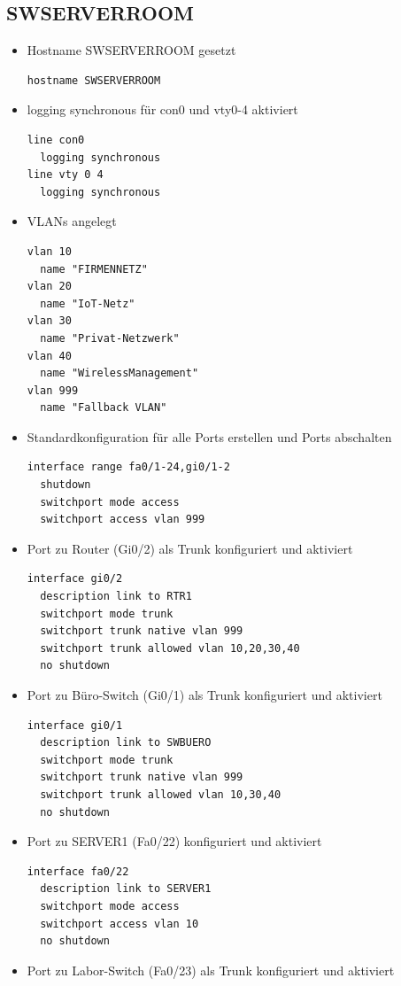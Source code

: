 \documentclass[11pt]{article}
\begin{document}
\subsection{SWSERVERROOM}
\label{sec:org86be69a}
\begin{itemize}
\item Hostname SWSERVERROOM gesetzt
\begin{verbatim}
hostname SWSERVERROOM
\end{verbatim}
\item logging synchronous für con0 und vty0-4 aktiviert
\begin{verbatim}
line con0
  logging synchronous
line vty 0 4
  logging synchronous
\end{verbatim}
\item VLANs angelegt
\begin{verbatim}
vlan 10
  name "FIRMENNETZ"
vlan 20
  name "IoT-Netz"
vlan 30
  name "Privat-Netzwerk"
vlan 40
  name "WirelessManagement"
vlan 999
  name "Fallback VLAN"
\end{verbatim}
\item Standardkonfiguration für alle Ports erstellen und Ports abschalten
\begin{verbatim}
interface range fa0/1-24,gi0/1-2
  shutdown
  switchport mode access
  switchport access vlan 999
\end{verbatim}
\item Port zu Router (Gi0/2) als Trunk konfiguriert und aktiviert
\begin{verbatim}
interface gi0/2
  description link to RTR1
  switchport mode trunk
  switchport trunk native vlan 999
  switchport trunk allowed vlan 10,20,30,40
  no shutdown
\end{verbatim}
\item Port zu Büro-Switch (Gi0/1) als Trunk konfiguriert und aktiviert
\begin{verbatim}
interface gi0/1
  description link to SWBUERO
  switchport mode trunk
  switchport trunk native vlan 999
  switchport trunk allowed vlan 10,30,40
  no shutdown
\end{verbatim}
\item Port zu SERVER1 (Fa0/22) konfiguriert und aktiviert
\begin{verbatim}
interface fa0/22
  description link to SERVER1
  switchport mode access
  switchport access vlan 10
  no shutdown
\end{verbatim}
\item Port zu Labor-Switch (Fa0/23) als Trunk konfiguriert und aktiviert

\end{itemize}
\end{document}
